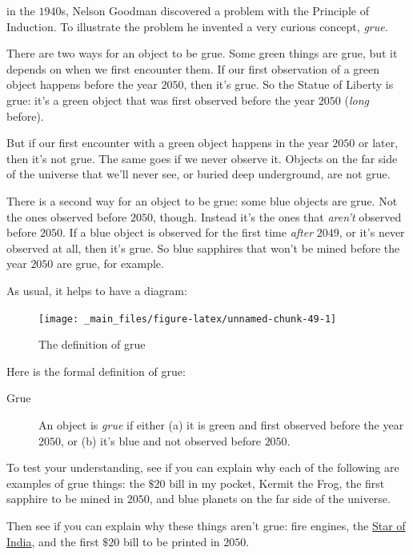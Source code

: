 \documentclass[justified]{tufte-book}
\begin{document}
 in the \(1940\)s, Nelson Goodman discovered a problem with the Principle of Induction. To illustrate the problem he invented a very curious concept, \emph{grue}.

There are two ways for an object to be grue. Some green things are grue, but it depends on when we first encounter them. If our first observation of a green object happens before the year \(2050\), then it's grue. So the Statue of Liberty is grue: it's a green object that was first observed before the year \(2050\) (\emph{long} before).

But if our first encounter with a green object happens in the year \(2050\) or later, then it's not grue. The same goes if we never observe it. Objects on the far side of the universe that we'll never see, or buried deep underground, are not grue.

There is a second way for an object to be grue: some blue objects are grue. Not the ones observed before \(2050\), though. Instead it's the ones that \emph{aren't} observed before \(2050\). If a blue object is observed for the first time \emph{after} \(2049\), or it's never observed at all, then it's grue. So blue sapphires that won't be mined before the year \(2050\) are grue, for example.

As usual, it helps to have a diagram:

\begin{figure}
\texttt{[image: \_main\_files/figure-latex/unnamed-chunk-49-1]} \caption[The definition of grue]{The definition of grue}\label{fig:unnamed-chunk-49}
\end{figure}

Here is the formal definition of grue:

\begin{description}
\item[Grue]
An object is \emph{grue} if either (a) it is green and first observed before the year \(2050\), or (b) it's blue and not observed before \(2050\).
\end{description}

To test your understanding, see if you can explain why each of the following are examples of grue things: the \(\$20\) bill in my pocket, Kermit the Frog, the first sapphire to be mined in \(2050\), and blue planets on the far side of the universe.

Then see if you can explain why these things aren't grue: fire engines, the \href{https://en.wikipedia.org/wiki/Star_of_India_(gem)}{Star of India}, and the first \(\$20\) bill to be printed in \(2050\).
\end{document}
